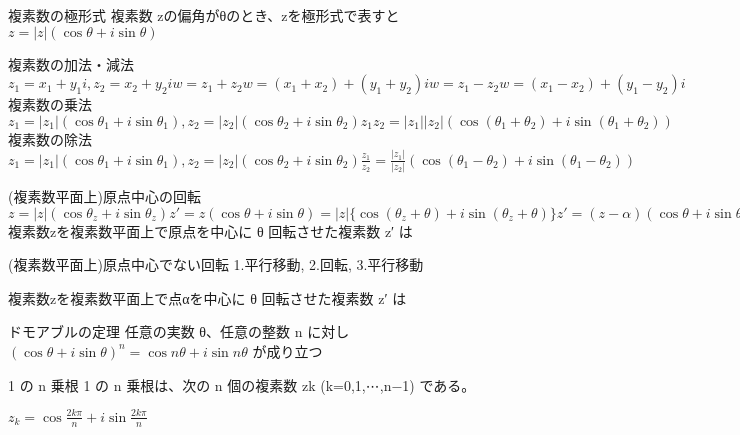 複素数の極形式
複素数 zの偏角がθのとき、zを極形式で表すと
$
z=|z|(\cos\theta+i\sin\theta)
$

複素数の加法・減法
$
z_1=x_1+y_1i, z_2=x_2+y_2i
w=z_1+z_2
w=(x_1+x_2)+(y_1+y_2)i
w=z_1-z_2
w=(x_1-x_2)+(y_1-y_2)i
$
複素数の乗法
$
z_1=|z_1|(\cos\theta_1+i\sin\theta_1), z_2=|z_2|(\cos\theta_2+i\sin\theta_2)
z_1z_2=|z_1||z_2|(\cos(\theta_1+\theta_2)+i\sin(\theta_1+\theta_2))
$
複素数の除法
$
z_1=|z_1|(\cos\theta_1+i\sin\theta_1), z_2=|z_2|(\cos\theta_2+i\sin\theta_2)
\frac{z_1}{z_2}=\frac{|z_1|}{|z_2|}(\cos(\theta_1-\theta_2)+i\sin(\theta_1-\theta_2))
$

(複素数平面上)原点中心の回転
$
z=|z|(\cos\theta_z+i\sin\theta_z)
z'=z(\cos\theta+i\sin\theta)=|z|\{\cos(\theta_z+\theta)+i\sin(\theta_z+\theta)\}
z'=(z-\alpha)(\cos\theta+i\sin\theta)+\alpha
$
複素数zを複素数平面上で原点を中心に θ 回転させた複素数 z′ は

(複素数平面上)原点中心でない回転
1.平行移動, 2.回転, 3.平行移動

複素数zを複素数平面上で点αを中心に θ 回転させた複素数 z′ は

ドモアブルの定理
任意の実数 θ、任意の整数 n に対し
$
(\cos\theta+i\sin\theta)^n=\cos n\theta+i\sin n\theta
$
が成り立つ

1 の n 乗根
1 の n 乗根は、次の n 個の複素数 zk (k=0,1,⋯,n−1) である。

$z_k = \cos\frac{2k\pi}{n} + i\sin\frac{2k\pi}{n}$